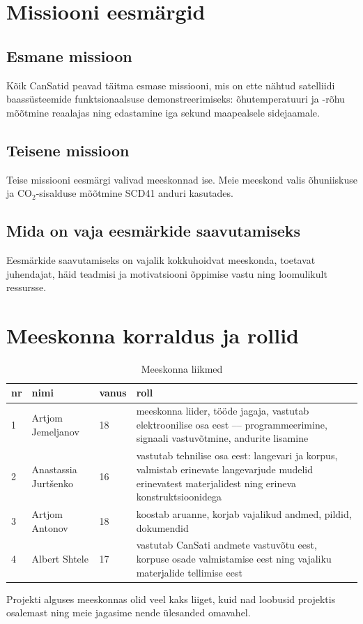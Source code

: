 \section{Missiooni eesmärgid}

\subsection{Esmane missioon}

Kõik CanSatid peavad täitma esmase missiooni, mis on ette nähtud satelliidi baassüsteemide funktsionaalsuse demonstreerimiseks: õhutemperatuuri ja -rõhu mõõtmine reaalajas ning edastamine iga sekund maapealsele sidejaamale.

\subsection{Teisene missioon}

Teise missiooni eesmärgi valivad meeskonnad ise. Meie meeskond valis õhuniiskuse ja CO$_2$-sisalduse mõõtmine SCD41 anduri kasutades.

\subsection{Mida on vaja eesmärkide saavutamiseks}

Eesmärkide saavutamiseks on vajalik kokkuhoidvat meeskonda, toetavat juhendajat, häid teadmisi ja motivatsiooni õppimise vastu ning loomulikult ressursse.

\section{Meeskonna korraldus ja rollid}

\begin{table}[H]
    \centering
    \noindent\setlength\tabcolsep{4pt}%
    \begin{tabularx}{\linewidth}{|l|l|l|>{\RaggedRight\arraybackslash}X|}
        \hline
        \textbf{nr} & \textbf{nimi} & \textbf{vanus} & \textbf{roll}\\
        \hline
        \hline
        1 & Artjom Jemeljanov & 18 & meeskonna liider, tööde jagaja, vastutab elektroonilise osa eest --– programmeerimine, signaali vastuvõtmine, andurite lisamine\\
        \hline
        2 & Anastassia Jurtšenko & 16 & vastutab tehnilise osa eest: langevari ja korpus, valmistab erinevate langevarjude mudelid erinevatest materjalidest ning erineva konstruktsioonidega\\
        \hline
        3 & Artjom Antonov & 18 & koostab aruanne, korjab vajalikud andmed, pildid, dokumendid\\
        \hline
        4 & Albert Shtele& 17 & vastutab CanSati andmete vastuvõtu eest, korpuse osade valmistamise eest ning vajaliku materjalide tellimise eest\\
        \hline
    \end{tabularx}
    \caption{Meeskonna liikmed}
    \label{tab:1}
\end{table}

Projekti alguses meeskonnas olid veel kaks liiget, kuid nad loobusid projektis osalemast ning meie jagasime nende ülesanded omavahel.